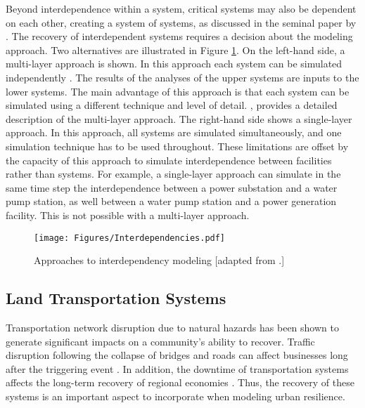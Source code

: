 Beyond interdependence within a system, critical systems may also be dependent on each other, creating a system of systems, as discussed in the seminal paper by \citet{rinaldi2001identifying}. The recovery of interdependent systems requires a decision about the modeling approach. Two alternatives are illustrated in Figure \ref{fig:Interdependencies}. On the left-hand side, a multi-layer approach is shown. In this approach each system can be simulated independently \citep{guidotti2017multi}. The results of the analyses of the upper systems are inputs to the lower systems. The main advantage of this approach is that each system can be simulated using a different technique and level of detail. \cite[p.243]{cimellaro2016resilience}, provides a detailed description of the multi-layer approach. The right-hand side shows a single-layer approach. In this approach, all systems are simulated simultaneously, and one simulation technique has to be used throughout. These limitations are offset by the capacity of this approach to simulate interdependence between facilities rather than systems. For example, a single-layer approach can simulate in the same time step the interdependence between a power substation and a water pump station, as well between a water pump station and a power generation facility. This is not possible with a multi-layer approach.\ 

\begin{figure}[htb]
    \centering
    \texttt{[image: Figures/Interdependencies.pdf]}
    \caption{Approaches to interdependency modeling [adapted from \citet{cimellaro2016resilience}.]}
    \label{fig:Interdependencies}
\end{figure}

\subsection{Land Transportation Systems}
Transportation network disruption due to natural hazards has been shown to generate significant impacts on a community's ability to recover. Traffic disruption following the collapse of bridges and roads can affect businesses long after the triggering event \citep{boarnet1998business}. In addition, the downtime of transportation systems affects the long-term recovery of regional economies \citep{chang2000transportation}. Thus, the recovery of these systems is an important aspect to incorporate when modeling urban resilience. \


